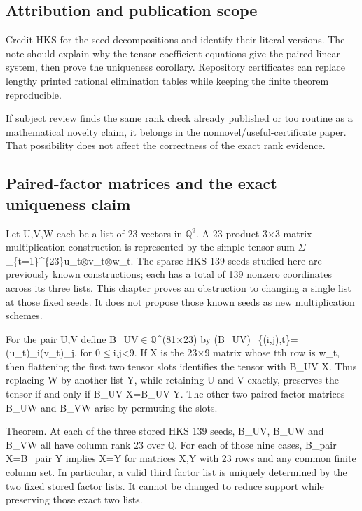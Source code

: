 \documentclass[11pt,a4paper]{article}
\begin{document}
\subsection{Attribution and publication scope}
Credit HKS for the seed decompositions and identify their literal versions. The note should explain why the tensor coefficient equations give the paired linear system, then prove the uniqueness corollary. Repository certificates can replace lengthy printed rational elimination tables while keeping the finite theorem reproducible.

If subject review finds the same rank check already published or too routine as a mathematical novelty claim, it belongs in the nonnovel/useful-certificate paper. That possibility does not affect the correctness of the exact rank evidence.

\subsection{Paired-factor matrices and the exact uniqueness claim}
Let U,V,W each be a list of 23 vectors in \ensuremath{\mathbb{Q}}\ensuremath{^9}. A 23-product 3\ensuremath{\times}3 matrix multiplication construction is represented by the simple-tensor sum \ensuremath{\Sigma}\_\{t=1\}\textasciicircum{}\{23\}u\_t\ensuremath{\otimes}v\_t\ensuremath{\otimes}w\_t. The sparse HKS 139 seeds studied here are previously known constructions; each has a total of 139 nonzero coordinates across its three lists. This chapter proves an obstruction to changing a single list at those fixed seeds. It does not propose those known seeds as new multiplication schemes.

For the pair U,V define B\_UV\ensuremath{\in}\ensuremath{\mathbb{Q}}\textasciicircum{}(81\ensuremath{\times}23) by (B\_UV)\_\{(i,j),t\}=(u\_t)\_i(v\_t)\_j, for 0\ensuremath{\leq}i,j<9. If X is the 23\ensuremath{\times}9 matrix whose tth row is w\_t, then flattening the first two tensor slots identifies the tensor with B\_UV X. Thus replacing W by another list Y, while retaining U and V exactly, preserves the tensor if and only if B\_UV X=B\_UV Y. The other two paired-factor matrices B\_UW and B\_VW arise by permuting the slots.

Theorem. At each of the three stored HKS 139 seeds, B\_UV, B\_UW and B\_VW all have column rank 23 over \ensuremath{\mathbb{Q}}. For each of those nine cases, B\_pair X=B\_pair Y implies X=Y for matrices X,Y with 23 rows and any common finite column set. In particular, a valid third factor list is uniquely determined by the two fixed stored factor lists. It cannot be changed to reduce support while preserving those exact two lists.
\end{document}
